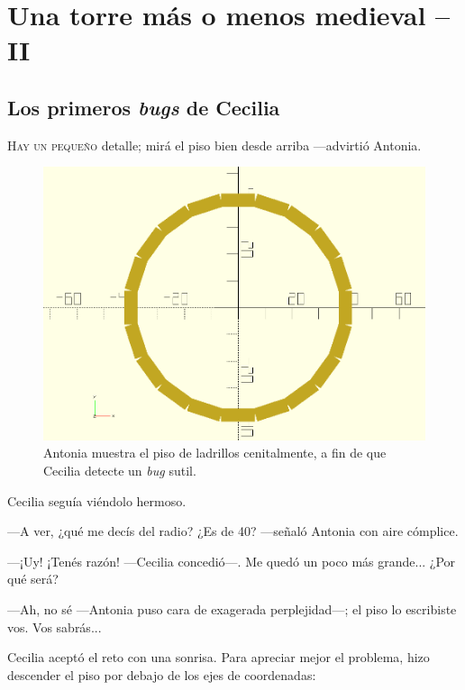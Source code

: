 \chapter{Una torre más o menos medieval -- II}

\section{Los primeros \emph{bugs} de Cecilia}
\label{sec:primer-bug}

\lettrine[ante=\raisebox{-1.5ex}{\Large ---},lines=2]{H}{ay un
  pequeño} detalle; mirá el piso bien desde arriba ---ad\-vir\-tió
Antonia.

\begin{figure}[ht]
    \centering
    \includegraphics[width=.6\textwidth]{imagenes/piso-cenit}
    \caption{Antonia muestra el piso de ladrillos cenitalmente, a fin
      de que Cecilia detecte un \emph{bug} sutil.}
    \label{fig:piso-cenit}
  \end{figure}


  Cecilia seguía viéndolo hermoso.

  ---A ver, ¿qué me decís del radio?  ¿Es de 40? ---señaló
  Antonia con aire cómplice.

  ---¡Uy!  ¡Tenés razón!  ---Cecilia concedió---. Me quedó un poco más
  grande... ¿Por qué será?

  ---Ah, no sé ---Antonia puso cara de exagerada per\-ple\-ji\-dad---;
  el piso lo escribiste vos. Vos sabrás...

  Cecilia aceptó el reto con una sonrisa. Para apreciar mejor el
  problema, hizo descender el piso por debajo de los ejes de
  coordenadas:

